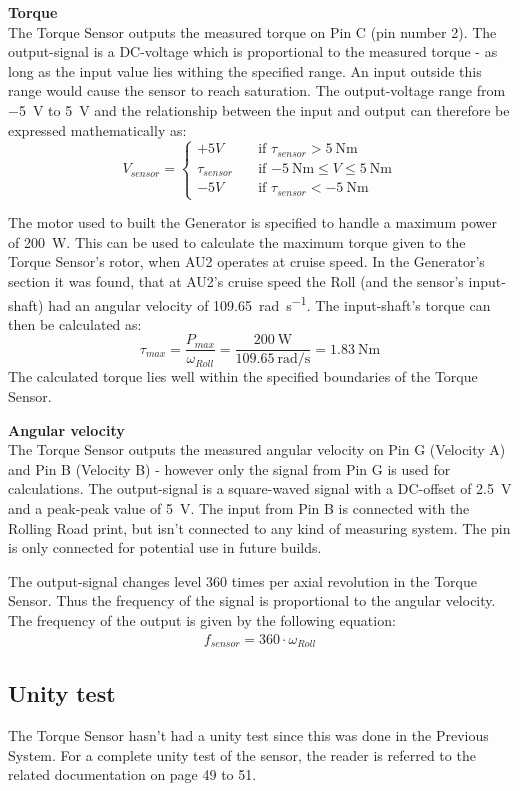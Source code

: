 \textbf{Torque}\\
The Torque Sensor outputs the measured torque on Pin C (pin number 2). The output-signal is a DC-voltage which is proportional to the measured torque - as long as the input value lies withing the specified range. An input outside this range would cause the sensor to reach saturation. The output-voltage range from \SI{-5}{\volt} to \SI{+5}{\volt} and the relationship between the input and output can therefore be expressed mathematically as:
\begin{equation}
	V_{sensor} = 
	\begin{cases}
		+5V				& \quad \text{if } \tau_{sensor} > \SI{+5}{\newton \meter}\\
		\tau_{sensor}   & \quad \text{if } \SI{-5}{\newton \meter} \leq V \leq \SI{+5}{\newton \meter}\\
		-5V				& \quad \text{if } \tau_{sensor} < \SI{-5}{\newton \meter}
	\end{cases}
\end{equation}

The motor used to built the Generator is specified to handle a maximum power of \SI{200}{\watt}\cite{Maxon}. This can be used to calculate the maximum torque given to the Torque Sensor's rotor, when AU2 operates at cruise speed. In the Generator's section it was found, that at AU2's cruise speed the Roll (and the sensor's input-shaft) had an angular velocity of \SI[per-mode=fraction]{109.65}{\radian \per \second}. The input-shaft's torque can then be calculated as:
\begin{equation}
	\tau_{max} = \frac{P_{max}}{\omega_{Roll}} = \frac{\SI{200}{\watt}}{\SI[per-mode=fraction]{109.65}{\radian \per \second}} = \SI{1.83}{\newton \meter}
\end{equation}
The calculated torque lies well within the specified boundaries of the Torque Sensor\cite{TorqueSensor}.

\textbf{Angular velocity}\\
The Torque Sensor outputs the measured angular velocity on Pin G (Velocity A) and Pin B (Velocity B) - however only the signal from Pin G is used for calculations. The output-signal is a square-waved signal with a DC-offset of \SI{2.5}{\volt} and a peak-peak value of \SI{5}{\volt}. The input from Pin B is connected with the Rolling Road print, but isn't connected to any kind of measuring system. The pin is only connected for potential use in future builds.

The output-signal changes level 360 times per axial revolution in the Torque Sensor. Thus the frequency of the signal is proportional to the angular velocity. The frequency of the output is given by the following equation:
\begin{equation}
	\begin{split}
		f_{sensor} = 360 \cdot \omega_{Roll}
	\end{split}
\end{equation}

\subsection{Unity test}
The Torque Sensor hasn't had a unity test since this was done in the Previous System\cite{BAC_rullefelt}. For a complete unity test of the sensor, the reader is referred to the related documentation on page 49 to 51.
